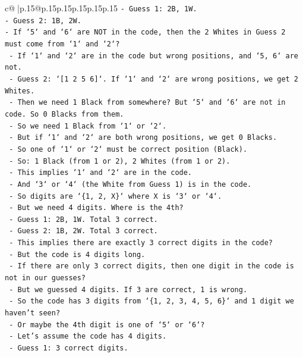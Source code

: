 \documentclass{article}
\begin{document}
{\begin{supertabular}{c@{$\;$}|p{.15\linewidth}@{}p{.15\linewidth}p{.15\linewidth}p{.15\linewidth}p{.15\linewidth}p{.15\linewidth}}
{{{\texttt{{-} Guess 1: 2B, 1W.} \\
\texttt{{-} Guess 2: 1B, 2W.} \\
\texttt{{-} If `5` and `6` are NOT in the code, then the 2 Whites in Guess 2 must come from `1` and `2`?} \\
\texttt{    {-} If `1` and `2` are in the code but wrong positions, and `5, 6` are not.} \\
\texttt{    {-} Guess 2: `{[}1 2 5 6{]}`. If `1` and `2` are wrong positions, we get 2 Whites.} \\
\texttt{    {-} Then we need 1 Black from somewhere? But `5` and `6` are not in code. So 0 Blacks from them.} \\
\texttt{    {-} So we need 1 Black from `1` or `2`.} \\
\texttt{    {-} But if `1` and `2` are both wrong positions, we get 0 Blacks.} \\
\texttt{    {-} So one of `1` or `2` must be correct position (Black).} \\
\texttt{    {-} So: 1 Black (from 1 or 2), 2 Whites (from 1 or 2).} \\
\texttt{    {-} This implies `1` and `2` are in the code.} \\
\texttt{    {-} And `3` or `4` (the White from Guess 1) is in the code.} \\
\texttt{    {-} So digits are `\{1, 2, X\}` where X is `3` or `4`.} \\
\texttt{    {-} But we need 4 digits. Where is the 4th?} \\
\texttt{    {-} Guess 1: 2B, 1W. Total 3 correct.} \\
\texttt{    {-} Guess 2: 1B, 2W. Total 3 correct.} \\
\texttt{    {-} This implies there are exactly 3 correct digits in the code?} \\
\texttt{    {-} But the code is 4 digits long.} \\
\texttt{    {-} If there are only 3 correct digits, then one digit in the code is not in our guesses?} \\
\texttt{    {-} But we guessed 4 digits. If 3 are correct, 1 is wrong.} \\
\texttt{    {-} So the code has 3 digits from `\{1, 2, 3, 4, 5, 6\}` and 1 digit we haven't seen?} \\
\texttt{    {-} Or maybe the 4th digit is one of `5` or `6`?} \\
\texttt{    {-} Let's assume the code has 4 digits.} \\
\texttt{    {-} Guess 1: 3 correct digits.} \\
}}}
\end{supertabular}}
\end{document}
